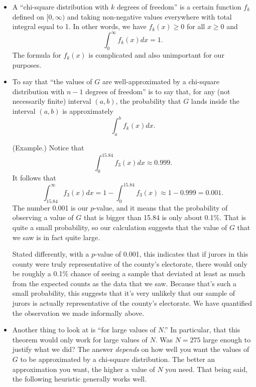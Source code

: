 \documentclass[letterpaper]{article}
\begin{document}
\begin{itemize}
    \item A ``chi-square distribution with $k$ degrees of freedom'' is a certain function $f_k$ defined on $[0, \infty)$ and taking non-negative values everywhere with total integral equal to 1. In other words, we have $f_{k}(x) \geq 0$ for all $x \geq 0$ and \[\int_{0}^{\infty} f_{k}(x) dx = 1.\] The formula for $f_{k}(x)$ is complicated and also unimportant for our purposes. 
    
    \item To say that ``the values of $G$ are well-approximated by a chi-square distribution with $n - 1$ degrees of freedom'' is to say that, for any (not necessarily finite) interval $(a, b)$, the probability that $G$ lands inside the interval $(a, b)$ is approximately 
    \[\int_{a}^{b} f_{k}(x) dx.\]

    \begin{mdframed}
        (Example.) Notice that 
        \[\int_0^{15.84} f_{3}(x)dx \approx 0.999.\]
        It follows that 
        \[\int_{15.84}^{\infty} f_{3}(x) dx = 1 - \int_{0}^{15.84} f_3(x) \approx 1 - 0.999 = 0.001.\]
        The number 0.001 is our $p$-value, and it means that the probability of observing a value of $G$ that is bigger than 15.84 is only about 0.1\%. That is quite a small probability, so our calculation suggests that the value of $G$ that we saw is in fact quite large. 
    
        \bigskip 
    
        Stated differently, with a $p$-value of 0.001, this indicates that if jurors in this county were truly representative of the county's electorate, there would only be roughly a 0.1\% chance of seeing a sample that deviated at least as much from the expected counts as the data that we saw. Because that's such a small probability, this suggests that it's very unlikely that our sample of jurors is actually representative of the county's electorate. We have quantified the observation we made informally above.
    \end{mdframed}

    \item Another thing to look at is ``for large values of $N$.'' In particular, that this theorem would only work for large values of $N$. Was $N = 275$ large enough to justify what we did? The answer \emph{depends} on how well you want the values of $G$ to be approximated by a chi-square distribution. The better an approximation you want, the higher a value of $N$ you need. That being said, the following heuristic generally works well. 
\end{itemize}
\end{document}
